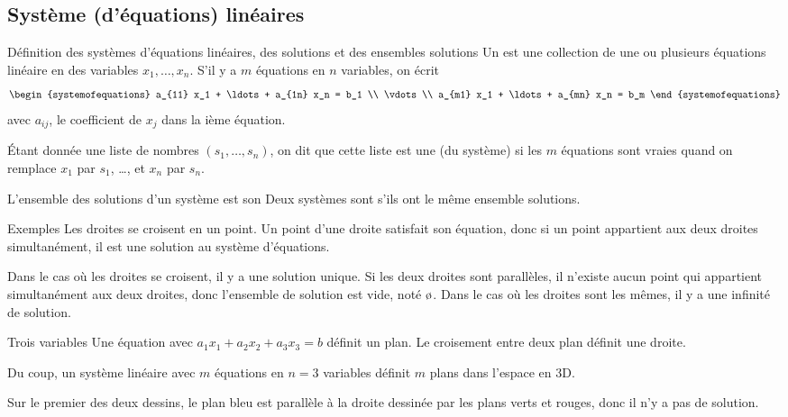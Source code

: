 \documentclass{article}
\begin{document}
\subsection{Système (d'équations) linéaires}
\begin{parag}{Définition des systèmes d'équations linéaires, des solutions et des ensembles solutions}
    Un  est une collection de une ou plusieurs équations linéaire en des variables $x_1, \ldots, x_n$. S'il y a $m$ équations en $n$ variables, on écrit
    \[\begin{systemofequations}
    a_{11} x_1 + \ldots + a_{1n} x_n = b_1 \\
    \vdots \\
    a_{m1} x_1 + \ldots + a_{mn} x_n = b_m
    \end{systemofequations}\]
    avec $a_{ij}$, le coefficient de $x_j$ dans la ième équation.

    Étant donnée une liste de nombres $\left(s_1, \ldots, s_n\right)$, on dit que cette liste est une  (du système) si les $m$ équations sont vraies quand on remplace $x_1$ par $s_1$, \ldots, et $x_n$ par $s_n$.

   L'ensemble des solutions d'un système est son  Deux systèmes sont  s'ils ont le même ensemble solutions.
\end{parag}

\begin{parag}{Exemples}
    Les droites se croisent en un point. Un point d'une droite satisfait son équation, donc si un point appartient aux deux droites simultanément, il est une solution au système d'équations.


    Dans le cas où les droites se croisent, il y a une solution unique. Si les deux droites sont parallèles, il n'existe aucun point qui appartient simultanément aux deux droites, donc l'ensemble de solution est vide, noté $\o$. Dans le cas où les droites sont les mêmes, il y a une infinité de solution.
\end{parag}

\begin{parag}{Trois variables}
    Une équation avec $a_1 x_1 + a_2 x_2 + a_3 x_3 = b$ définit un plan. Le croisement entre deux plan définit une droite.

    Du coup, un système linéaire avec $m$ équations en $n = 3$ variables définit $m$ plans dans l'espace en 3D.


    Sur le premier des deux dessins, le plan bleu est parallèle à la droite dessinée par les plans verts et rouges, donc il n'y a pas de solution.
\end{parag}
\end{document}
